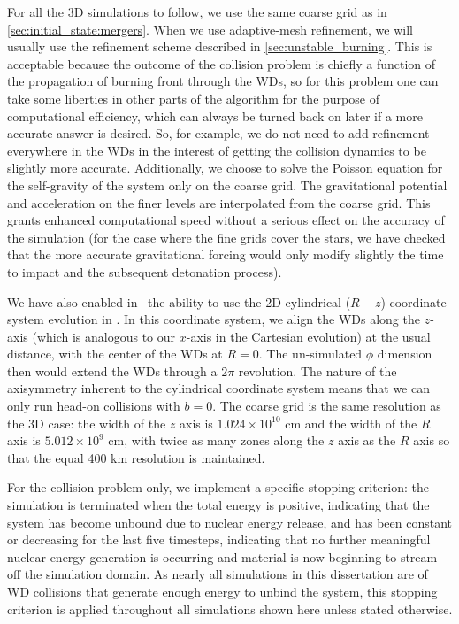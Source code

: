 \documentclass[12pt]{article}
\begin{document}
For all the 3D simulations to follow, we use the same coarse grid as in \autoref{sec:initial_state:mergers}.
When we use adaptive-mesh refinement, we will usually
use the refinement scheme described in \autoref{sec:unstable_burning}. This is
acceptable because the outcome of the collision problem is chiefly a function
of the propagation of burning front through the WDs, so for this problem one
can take some liberties in other parts of the algorithm for the purpose of
computational efficiency, which can always be turned back on later if a more
accurate answer is desired. So, for example, we do not need to add refinement
everywhere in the WDs in the interest of getting the collision dynamics to be
slightly more accurate. Additionally, we choose to solve the Poisson equation
for the self-gravity of the system only on the coarse grid. The gravitational
potential and acceleration on the finer levels are interpolated from the coarse
grid. This grants enhanced computational speed without a serious effect on the
accuracy of the simulation (for the case where the fine grids cover the stars,
we have checked that the more accurate gravitational forcing would only modify
slightly the time to impact and the subsequent detonation process).

We have also enabled in \wdmerger\ the ability to use the 2D cylindrical ($R-z$)
coordinate system evolution in \castro. In this coordinate system, we align
the WDs along the $z$-axis (which is analogous to our $x$-axis in the Cartesian
evolution) at the usual distance, with the center of the WDs at $R = 0$. The
un-simulated $\phi$ dimension then would extend the WDs through a $2\pi$ revolution.
The nature of the axisymmetry inherent to the cylindrical coordinate system
means that we can only run head-on collisions with $b = 0$. The coarse grid
is the same resolution as the 3D case: the width of the $z$ axis is $1.024 \times 10^{10}$
cm and the width of the $R$ axis is $5.012 \times 10^{9}$ cm, with twice as
many zones along the $z$ axis as the $R$ axis so that the equal 400 km
resolution is maintained.

For the collision problem only, we implement a specific stopping criterion:
the simulation is terminated when the total energy is positive, indicating that
the system has become unbound due to nuclear energy release, and has been
constant or decreasing for the last five timesteps, indicating that no further
meaningful nuclear energy generation is occurring and material is now beginning
to stream off the simulation domain. As nearly all simulations in this dissertation
are of WD collisions that generate enough energy to unbind the system, this stopping
criterion is applied throughout all simulations shown here unless stated otherwise.
\end{document}
